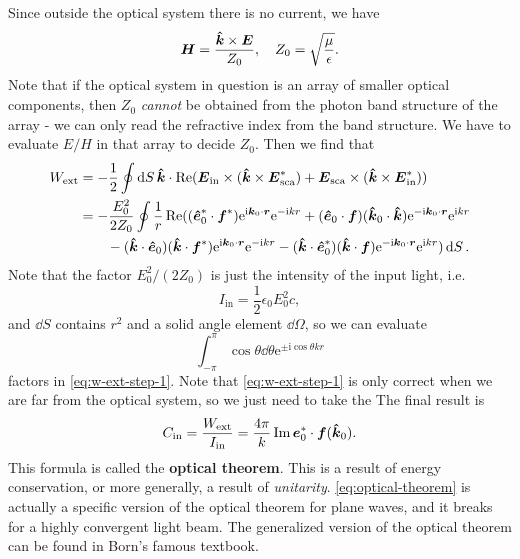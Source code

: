 \documentclass[hyperref, a4paper]{article}
\newcommand*{\ii}{\mathrm{i}}
\newcommand*{\ee}{\mathrm{e}}
\newcommand*{\concept}[1]{{\textbf{#1}}}
\begin{document}
Since outside the optical system there is no current, we have 
\begin{equation}
    \vb*{H} = \frac{\vu*{k} \times \vb*{E}}{Z_0}, \quad Z_0 = \sqrt{\frac{\mu}{\epsilon}}.
\end{equation}
Note that if the optical system in question is an array of smaller optical components, 
then $Z_0$ \emph{cannot} be obtained from the photon band structure of the array 
- we can only read the refractive index from the band structure. 
We have to evaluate $E / H$ in that array to decide $Z_0$.
Then we find that 
\begin{equation}
    \begin{aligned}
        W_\text{ext} &= - \frac{1}{2} \oint \dd{S} \vu*{k} \cdot 
            \Re (\vb*{E}_\text{in} \times (\vu*{k} \times \vb*{E}_\text{sca}^*) + \vb*{E}_\text{sca} \times (\vu*{k} \times \vb*{E}_\text{in}^*)) \\
        &= - \frac{E_0^2}{2 Z_0} \oint \frac{1}{r} \Re (
        (\vu*{e}^*_0 \cdot \vb*{f}^* ) \ee^{\ii \vb*{k}_0 \cdot \vb*{r}} \ee^{- \ii k r} 
        + (\vu*{e}_0 \cdot \vb*{f}) (\vu*{k}_0 \cdot \vu*{k}) \ee^{- \ii \vb*{k}_0 \cdot \vb*{r}} \ee^{\ii k r} \\
        &\quad \quad  - (\vu*{k} \cdot \vu*{e}_0) (\vu*{k} \cdot \vb*{f}^*) \ee^{\ii \vb*{k}_0 \cdot \vb*{r}} \ee^{- \ii k r} 
         - (\vu*{k} \cdot \vu*{e}_0^*) (\vu*{k} \cdot \vb*{f}) \ee^{- \ii \vb*{k}_0 \cdot \vb*{r}} \ee^{\ii k r}  ) \dd{S}.
    \end{aligned}
    \label{eq:w-ext-step-1}
\end{equation}
Note that the factor $E_0^2 / (2 Z_0)$ is just the intensity of the input light, i.e. 
\begin{equation}
    I_\text{in} = \frac{1}{2} \epsilon_0 E_0^2 c,
\end{equation}
and $\dd{S}$ contains $r^2$ and a solid angle element $\dd{\Omega}$, so we can evaluate   
\[
    \int_{-\pi}^\pi \cos \theta \dd{\theta} \ee^{\pm \ii \cos \theta k r}
\]
factors in \eqref{eq:w-ext-step-1}. Note that \eqref{eq:w-ext-step-1} is only correct when we are 
far from the optical system, so we just need to take the 
The final result is 
\begin{equation}
    C_\text{in} = \frac{W_\text{ext}}{I_\text{in}} = \frac{4 \pi}{k} \Im \vb*{e}_0^* \cdot \vb*{f}(\vu*{k}_0).
    \label{eq:optical-theorem}
\end{equation}
This formula is called the \concept{optical theorem}. This is a result of energy conservation, or 
more generally, a result of \emph{unitarity}. 
\eqref{eq:optical-theorem} is actually a specific version of the optical theorem for plane waves, 
and it breaks for a highly convergent light beam. The generalized version of the optical theorem 
can be found in Born's famous textbook.
\end{document}
